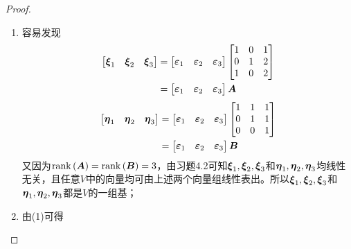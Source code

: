 \begin{proof}
    \begin{enumerate}
        \item {
              容易发现
              \begin{align*}
                  \begin{bmatrix}\boldsymbol{\xi}_1&\boldsymbol{\xi}_2&\boldsymbol{\xi}_3\end{bmatrix}
                   & =
                  \begin{bmatrix}\boldsymbol{\varepsilon}_1&\boldsymbol{\varepsilon}_2&\boldsymbol{\varepsilon}_3\end{bmatrix}
                  \begin{bmatrix}
                      1 & 0 & 1 \\
                      0 & 1 & 2 \\
                      1 & 0 & 2
                  \end{bmatrix}          \\
                   & =\begin{bmatrix}\boldsymbol{\varepsilon}_1&\boldsymbol{\varepsilon}_2&\boldsymbol{\varepsilon}_3\end{bmatrix}\boldsymbol{A}
              \end{align*}
              \begin{align*}
                  \begin{bmatrix}\boldsymbol{\eta}_1&\boldsymbol{\eta}_2&\boldsymbol{\eta}_3\end{bmatrix}
                   & =
                  \begin{bmatrix}\boldsymbol{\varepsilon}_1&\boldsymbol{\varepsilon}_2&\boldsymbol{\varepsilon}_3\end{bmatrix}
                  \begin{bmatrix}
                      1 & 1 & 1 \\
                      0 & 1 & 1 \\
                      0 & 0 & 1
                  \end{bmatrix}          \\
                   & =\begin{bmatrix}\boldsymbol{\varepsilon}_1&\boldsymbol{\varepsilon}_2&\boldsymbol{\varepsilon}_3\end{bmatrix}\boldsymbol{B}
              \end{align*}
              又因为\(\mathrm{rank}\left( \boldsymbol{A} \right)=\mathrm{rank}\left( \boldsymbol{B} \right)=3\)，由习题4.2可知\(\boldsymbol{\xi}_1,\boldsymbol{\xi}_2,\boldsymbol{\xi}_3\)和\(\boldsymbol{\eta}_1,\boldsymbol{\eta}_2,\boldsymbol{\eta}_3\)均线性无关，且任意\(V\)中的向量均可由上述两个向量组线性表出。所以\(\boldsymbol{\xi}_1,\boldsymbol{\xi}_2,\boldsymbol{\xi}_3\)和\(\boldsymbol{\eta}_1,\boldsymbol{\eta}_2,\boldsymbol{\eta}_3\)都是\(V\)的一组基；
              }
        \item {
              由(1)可得
}
\end{enumerate}
\end{proof}
